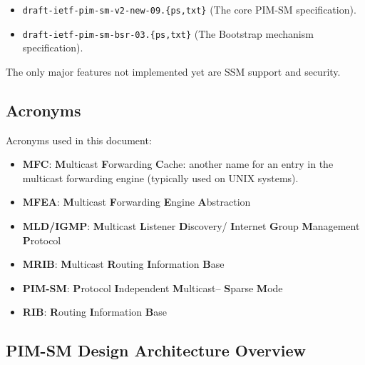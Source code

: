 \documentclass[11pt]{article}
\begin{document}
\begin{itemize}
  \item \verb=draft-ietf-pim-sm-v2-new-09.{ps,txt}= (The core PIM-SM
  specification).
  \item \verb=draft-ietf-pim-sm-bsr-03.{ps,txt}= (The Bootstrap mechanism
  specification).
\end{itemize}

The only major features not implemented yet are SSM support and security.


\subsection{Acronyms}

Acronyms used in this document:

\begin{itemize}

  \item {\bf MFC}: {\bf M}ulticast {\bf F}orwarding {\bf C}ache: another
  name for an entry in the multicast forwarding engine (typically used
  on UNIX systems).

  \item {\bf MFEA}: {\bf M}ulticast {\bf F}orwarding {\bf E}ngine
  {\bf A}bstraction

  \item {\bf MLD/IGMP}: {\bf M}ulticast {\bf L}istener {\bf D}iscovery/{\bf
  I}nternet {\bf G}roup {\bf M}anagement {\bf P}rotocol

  \item {\bf MRIB}: {\bf M}ulticast {\bf R}outing {\bf I}nformation
  {\bf B}ase

  \item {\bf PIM-SM}: {\bf P}rotocol {\bf I}ndependent {\bf M}ulticast--{\bf
  S}parse {\bf M}ode

  \item {\bf RIB}: {\bf R}outing {\bf I}nformation {\bf B}ase

\end{itemize}


\subsection{PIM-SM Design Architecture Overview}
\end{document}

